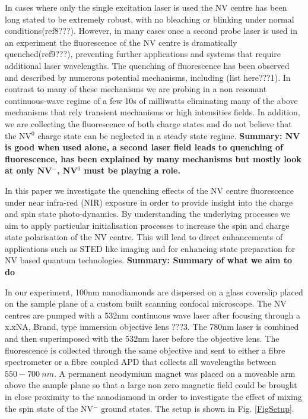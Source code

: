 \documentclass[,prl,twocolumn]{revtex4}
\begin{document}
In cases where only the single excitation laser is used the NV centre has been long stated to be extremely robust, with no bleaching or blinking under normal conditions(ref8???). However, in many cases once a second probe laser is used in an experiment the fluorescence of the NV centre is dramatically quenched(ref9???), preventing further applications and systems that require additional laser wavelengths. The quenching of fluorescence has been observed and described by numerous potential mechanisms, including (list here???1). In contrast to many of these mechanisms we are probing in a non resonant continuous-wave regime of a few 10s of milliwatts eliminating many of the above mechanisms that rely transient mechanisms or high intensities fields. In addition, we are collecting the fluorescence of both charge states and do not believe that the NV$^0$ charge state can be neglected in a steady state regime. \textbf{Summary: NV is good when used alone, a second laser field leads to quenching of fluorescence, has been explained by many mechanisms but mostly look at only NV$^-$, NV$^0$ must be playing a role.}

In this paper we investigate the quenching effects of the NV centre fluorescence under near infra-red (NIR) exposure in order to provide insight into the charge and spin state photo-dynamics. By understanding the underlying processes we aim to apply particular initialisation processes to increase the spin and charge state polarisation of the NV centre. This will lead to direct enhancements of applications such as STED like imaging and for enhancing state preparation for NV based quantum technologies.
\textbf{Summary: Summary of what we aim to do}


In our experiment, 100nm nanodiamonds are dispersed on a glass coverslip placed on the sample plane of a custom built scanning confocal microscope. The NV centres are pumped with a 532nm continuous wave laser after focusing through a x.xNA, Brand, type immersion objective lens ???3. The 780nm laser is combined and then superimposed with the 532nm laser before the objective lens. The fluorescence is collected through the same objective and sent to either a fibre spectrometer or a fibre coupled APD that collects all wavelengths between $550-\SI{700}{nm}$. A permanent neodymium magnet was placed on a moveable arm above the sample plane so that a large non zero magnetic field could be brought in close proximity to the nanodiamond in order to investigate the effect of mixing the spin state of the NV$^-$ ground states. The setup is shown in Fig. \ref{FigSetup}.
\end{document}
